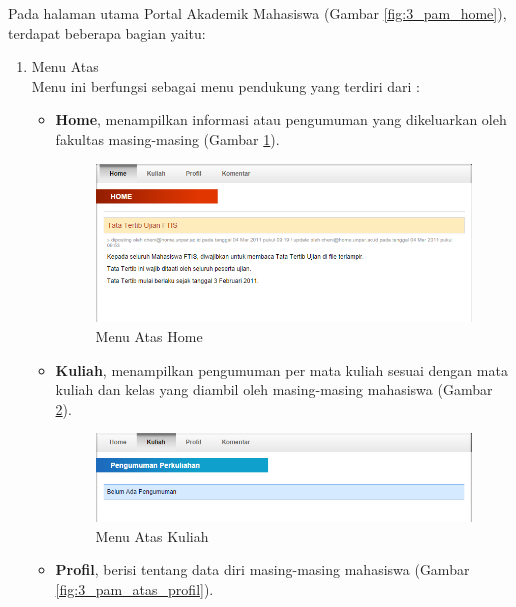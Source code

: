 Pada halaman utama Portal Akademik Mahasiswa (Gambar \ref{fig:3_pam_home}), terdapat beberapa bagian yaitu:
\begin{enumerate}
	\item Menu Atas\\
	Menu ini berfungsi sebagai menu pendukung yang terdiri dari : 
	\begin{itemize}
		\item \textbf{Home}, menampilkan informasi atau pengumuman yang dikeluarkan oleh fakultas masing-masing (Gambar \ref{fig:3_pam_atas_home}). 
		
		\begin{figure}[H]
			\centering
			\includegraphics[scale=0.5]{Gambar/pam-atas-home}
			\caption{Menu Atas Home} 
			\label{fig:3_pam_atas_home}
		\end{figure}
		
		\item \textbf{Kuliah}, menampilkan pengumuman per mata kuliah sesuai dengan mata kuliah dan kelas yang diambil oleh masing-masing mahasiswa (Gambar \ref{fig:3_pam_atas_kuliah}).  
		
		\begin{figure}[H]
			\centering
			\includegraphics[scale=0.5]{Gambar/pam-atas-kuliah}
			\caption{Menu Atas Kuliah} 
			\label{fig:3_pam_atas_kuliah}
		\end{figure}
		
		\item \textbf{Profil}, berisi tentang data diri masing-masing mahasiswa (Gambar \ref{fig:3_pam_atas_profil}). 
		

\end{itemize}
\end{enumerate}
